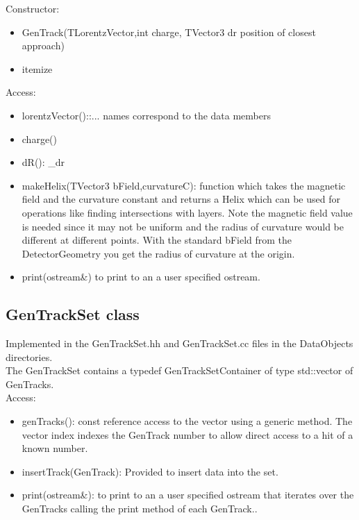 \documentclass[aps,prd,superscriptaddress,floatfix]{revtex4}
\begin{document}
Constructor:

\begin{itemize}
\item GenTrack(TLorentzVector,int charge, TVector3 dr position of closest approach)
\item{itemize}
\end{itemize}


Access:
\begin{itemize}
\item lorentzVector()::... names correspond to the data members
\item charge()
\item dR(): \_dr

\item makeHelix(TVector3 bField,curvatureC): function which takes the magnetic field and the curvature constant and returns
a Helix which can be used for operations like finding intersections with layers.  Note the magnetic field
value is needed since it may not be uniform and the radius of curvature would be different at different points.
With the standard bField from the DetectorGeometry you get the radius of curvature at the origin.

\item print(ostream\&) to print to an a user specified ostream.
\end{itemize}


\subsection{GenTrackSet class}
Implemented in the GenTrackSet.hh and GenTrackSet.cc files in the DataObjects directories.
\\

The GenTrackSet contains a typedef GenTrackSetContainer of type std::vector of GenTracks.
\\
Access:

\begin{itemize}
\item genTracks(): const reference access to the vector using a generic method.
The vector index indexes the GenTrack number to allow direct access to a hit of a known number.

\item insertTrack(GenTrack): Provided to insert data into the set.

\item print(ostream\&): to print to an a user specified ostream that iterates over
the GenTracks calling the print method of each GenTrack..
\end{itemize}
\end{document}
